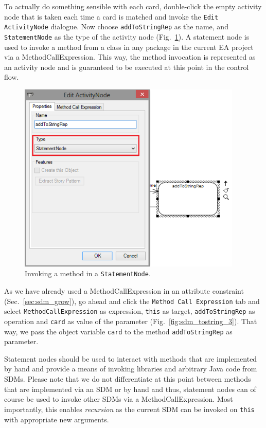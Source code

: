 To actually do something sensible with each card, double-click the empty
activity node that is taken each time a card is matched and invoke the \texttt{Edit
ActivityNode} dialogue.  Now choose \texttt{addToStringRep} as
the name, and \texttt{StatementNode} as the type of the activity node
(Fig.~\ref{fig:sdm_tostring_2}).
A statement node is used to invoke a method from a class in any package in the
current EA project via a MethodCallExpression.  This way, the method invocation
is represented as an activity node and is guaranteed to be executed at this
point in the control flow. 

\begin{figure}[htbp]
\begin{center}
  \includegraphics[width=0.95\textwidth]{pics/sdmBilder/toString/sdm73.png}
  \caption{Invoking a method in a \texttt{StatementNode}.}  
  \label{fig:sdm_tostring_2}
\end{center}
\end{figure}

As we have already used a MethodCallExpression in an attribute constraint
(Sec.~\ref{sec:sdm_grow}), go ahead and click the \texttt{Method Call
Expression} tab and select \texttt{MethodCallExpression} as expression,
\texttt{this} as target, \texttt{addToStringRep} as operation and \texttt{card} as value of the parameter (Fig.~\ref{fig:sdm_tostring_3}). That way, we pass the object variable \texttt{card} to the method
\texttt{addToStringRep} as parameter.

Statement nodes should be used to interact with methods that are
implemented by hand and provide a means of invoking libraries and arbitrary Java
code from SDMs.  Please note that we do not differentiate at this point between
methods that are implemented via an SDM or by hand and thus, statement nodes can
of course be used to invoke other SDMs via a MethodCallExpression.  Most
importantly, this enables \emph{recursion} as the current SDM can be invoked on
\texttt{this} with appropriate new arguments.  

